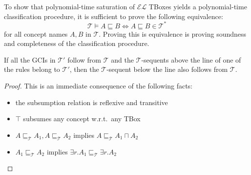 To show that polynomial-time saturation of $\mathcal{EL}$ TBoxes yields a polynomial-time classification procedure,
it is sufficient to prove the following equivalence:
\[
	\mathcal{T} \vDash A \sqsubseteq B \iff A \sqsubseteq B \in \mathcal{T}^*
\]
for all concept names $A, B$ in $\mathcal{T}$.
Proving this is equivalence is proving soundness and completeness of the classification procedure.

\begin{lemma}[Soundness]
	If all the GCIs in $\mathcal{T}'$ follow from $\mathcal{T}$
	and the $\mathcal{T}$-sequents above the line of one of the rules belong to $\mathcal{T}'$,
	then the $\mathcal{T}$-sequent below the line also follows from $\mathcal{T}$.
\end{lemma}
\begin{proof}
	This is an immediate consequence of the following facts:
	\begin{itemize}
		\item the subsumption relation is reflexive and transitive
		\item $\top$ subsumes any concept w.r.t.\ any TBox
		\item $A \sqsubseteq_{\mathcal{T}} A_1, A \sqsubseteq_{\mathcal{T}} A_2$ implies $A \sqsubseteq_{\mathcal{T}} A_1 \sqcap A_2$
		\item $A_1 \sqsubseteq_{\mathcal{T}} A_2 $ implies $\exists r.A_1 \sqsubseteq_{\mathcal{T}} \exists r.A_2$
			 \qedhere
	\end{itemize}
\end{proof}

